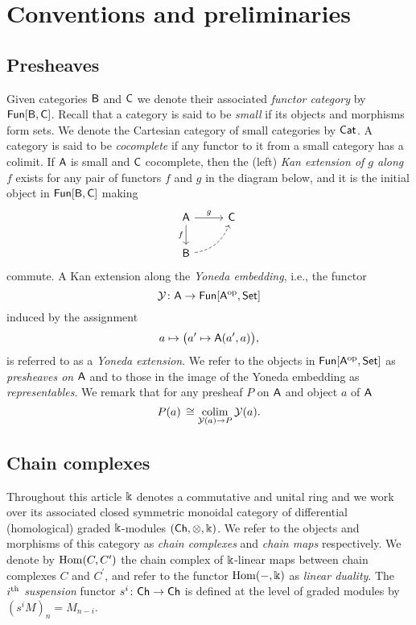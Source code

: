 
\section{Conventions and preliminaries} \label{s:preliminaries}

\subsection{Presheaves}

Given categories $\mathsf{B}$ and $\mathsf{C}$ we denote their associated \textit{functor category} by $\mathsf{Fun}[\mathsf{B}, \mathsf{C}]$.
Recall that a category is said to be \textit{small} if its objects and morphisms form sets.
We denote the Cartesian category of small categories by $\mathsf{Cat}$.
A category is said to be \textit{cocomplete} if any functor to it from a small category has a colimit.
If $\mathsf{A}$ is small and $\mathsf{C}$ cocomplete, then the (left) \textit{Kan extension of $g$ along $f$} exists for any pair of functors $f$ and $g$ in the diagram below, and it is the initial object in $\mathsf{Fun}[\mathsf{B}, \mathsf{C}]$ making
\begin{equation*}
\begin{tikzcd}[column sep=normal, row sep=normal]
\sA \arrow[d, "f"'] \arrow[r, "g"] & \sC \\
\sB \arrow[dashed, ur, bend right] & \quad
\end{tikzcd}
\end{equation*}
commute.
A Kan extension along the \textit{Yoneda embedding}, i.e., the functor
\[
\operatorname{\mathcal{Y}} \colon \mathsf{A} \to \mathsf{Fun}[\mathsf{A}^{\mathrm{op}}, \mathsf{Set}]
\]
induced by the assignment
\[
a \mapsto \big( a^\prime \mapsto \mathsf{A}(a^\prime, a) \big),
\]
is referred to as a \textit{Yoneda extension}.
We refer to the objects in $\mathsf{Fun}[\mathsf{A}^{\mathrm{op}}, \mathsf{Set}]$ as \textit{presheaves on $\mathsf{A}$} and to those in the image of the Yoneda embedding as \textit{representables}.
We remark that for any presheaf $P$ on $\mathsf{A}$ and object $a$ of $\mathsf{A}$
\[
P(a) \, \cong \operatorname*{colim}_{\operatorname{\mathcal{Y}}(a) \to P} \operatorname{\mathcal{Y}}(a).
\]

\subsection{Chain complexes}

Throughout this article $\Bbbk$ denotes a commutative and unital ring and we work over its associated closed symmetric monoidal category of differential (homological) graded $\Bbbk$-modules $(\mathsf{Ch}, \otimes, \Bbbk)$.
We refer to the objects and morphisms of this category as \textit{chain complexes} and \textit{chain maps} respectively. We denote by $\mathrm{Hom}(C, C^\prime)$ the chain complex of $\Bbbk$-linear maps between chain complexes $C$ and $C^\prime$, and refer to the functor $\mathrm{Hom}(-, \Bbbk)$ as \textit{linear duality}.
The $i^{\mathrm{th}}$ \textit{suspension} functor $s^i \colon \mathsf{Ch} \to \mathsf{Ch}$ is defined at the level of graded modules by $(s^{i}M)_n = M_{n-i}$.

